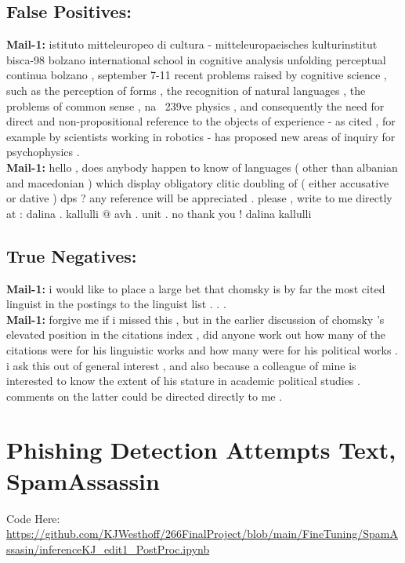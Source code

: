 \documentclass[
	letterpaper, %
	12pt, %
	unnumberedsections, %
	twoside, %
]{LTJournalArticle}
\begin{document}
\begin{appendices}
{	}

	\subsection{False Positives:}
	{\ttfamily \tiny
		\noindent\textbf{Mail-1:} istituto mitteleuropeo di cultura - mitteleuropaeisches kulturinstitut bisca-98 bolzano international school in cognitive analysis unfolding perceptual continua bolzano , september 7-11 recent problems raised by cognitive science , such as the perception of forms , the recognition of natural languages , the problems of common sense , na \ 239ve physics , and consequently the need for direct and non-propositional reference to the objects of experience - as cited , for example by scientists working in robotics - has proposed new areas of inquiry for psychophysics . \\

		\noindent\textbf{Mail-1:} hello , does anybody happen to know of languages ( other than albanian and macedonian ) which display obligatory clitic doubling of ( either accusative or dative ) dps ? any reference will be appreciated . please , write to me directly at : dalina . kallulli @ avh . unit . no thank you ! dalina kallulli \\


	}

	\subsection{True Negatives:}
	{\ttfamily \tiny
		\noindent\textbf{Mail-1:} i would like to place a large bet that chomsky is by far the most cited linguist in the postings to the linguist list . . . \\

		\noindent\textbf{Mail-1:} forgive me if i missed this , but in the earlier discussion of chomsky 's elevated position in the citations index , did anyone work out how many of the citations were for his linguistic works and how many were for his political works . i ask this out of general interest , and also because a colleague of mine is interested to know the extent of his stature in academic political studies . comments on the latter could be directed directly to me . \\


	}

	\section{Phishing Detection Attempts Text, SpamAssassin}\label{appendix:spamassassin}
	Code Here: \\
	\url{https://github.com/KJWesthoff/266FinalProject/blob/main/FineTuning/SpamAssasin/inferenceKJ_edit1_PostProc.ipynb}
	\

\end{appendices}
\end{document}
